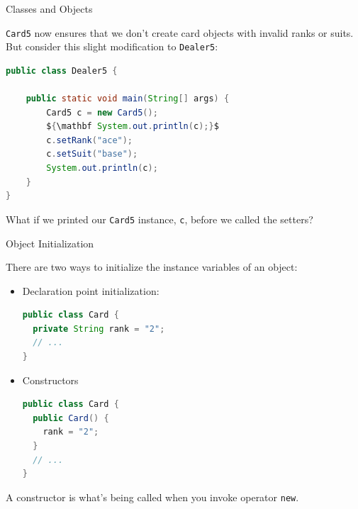 \documentclass{beamer}
\begin{document}
\begin{frame}[fragile]{Classes and Objects}


{\tt Card5} now ensures that we don't create card objects with invalid ranks or suits.
But consider this slight modification to {\tt Dealer5}:
\begin{lstlisting}[language=Java,mathescape=true]
public class Dealer5 {

    public static void main(String[] args) {
        Card5 c = new Card5();
        ${\mathbf System.out.println(c);}$
        c.setRank("ace");
        c.setSuit("base");
        System.out.println(c);
    }
}
\end{lstlisting}

What if we printed our {\tt Card5} instance, {\tt c}, before we called the setters?

\end{frame}

\begin{frame}[fragile]{Object Initialization}


There are two ways to initialize the instance variables of an object:
\begin{itemize}
\item Declaration point initialization:
\begin{lstlisting}[language=Java,mathescape=true]
public class Card {
  private String rank = "2";
  // ...
}
\end{lstlisting}
\item Constructors
\begin{lstlisting}[language=Java,mathescape=true]
public class Card {
  public Card() {
    rank = "2";
  }
  // ...
}
\end{lstlisting}

\end{itemize}
A constructor is what's being called when you invoke operator {\tt new}.
\end{frame}
\end{document}
